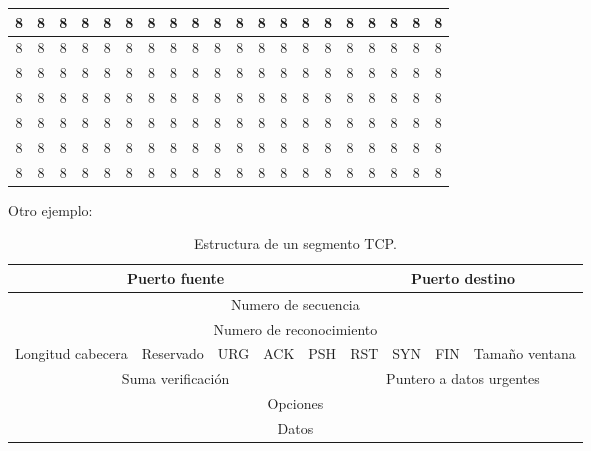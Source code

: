 \documentclass[letterpaper,11pt]{article}
\begin{document}
\begin{landscape}
\begin{center}
\begin{longtable}{|c|c|c|c|c|c|c|c|c|c|c|c|c|c|c|c|c|c|c|c|}
\hline
 8 & 8 & 8 & 8 & 8 & 8 & 8 & 8 & 8 & 8 & 8 & 8 & 8 & 8 & 8 & 8 & 8 & 8 & 8 & 8 \\
\hline
 8 & 8 & 8 & 8 & 8 & 8 & 8 & 8 & 8 & 8 & 8 & 8 & 8 & 8 & 8 & 8 & 8 & 8 & 8 & 8 \\
\hline
 8 & 8 & 8 & 8 & 8 & 8 & 8 & 8 & 8 & 8 & 8 & 8 & 8 & 8 & 8 & 8 & 8 & 8 & 8 & 8 \\
\hline
 8 & 8 & 8 & 8 & 8 & 8 & 8 & 8 & 8 & 8 & 8 & 8 & 8 & 8 & 8 & 8 & 8 & 8 & 8 & 8 \\
\hline
 8 & 8 & 8 & 8 & 8 & 8 & 8 & 8 & 8 & 8 & 8 & 8 & 8 & 8 & 8 & 8 & 8 & 8 & 8 & 8 \\
\hline
 8 & 8 & 8 & 8 & 8 & 8 & 8 & 8 & 8 & 8 & 8 & 8 & 8 & 8 & 8 & 8 & 8 & 8 & 8 & 8 \\
\hline
 8 & 8 & 8 & 8 & 8 & 8 & 8 & 8 & 8 & 8 & 8 & 8 & 8 & 8 & 8 & 8 & 8 & 8 & 8 & 8 \\
\hline
\end{longtable}
\end{center}

\end{landscape}

\newpage

Otro ejemplo:

\begin{table}[h!]
\centering
\resizebox{\textwidth}{!} {
\begin{tabular}{|c|c|c|c|c|c|c|c|c|}
\hline
\multicolumn{5}{|c|}{Puerto fuente} & \multicolumn{4}{|c|}{Puerto destino} \\ \hline
\multicolumn{9}{|c|}{Numero de secuencia} \\ \hline
\multicolumn{9}{|c|}{Numero de reconocimiento} \\ \hline
Longitud cabecera & Reservado & URG & ACK & PSH & RST & SYN & FIN & Tamaño ventana \\ \hline
\multicolumn{5}{|c|}{Suma verificación} & \multicolumn{4}{|c|}{Puntero a datos urgentes} \\ \hline
\multicolumn{9}{|c|}{Opciones} \\ \hline
\multicolumn{9}{|c|}{Datos} \\ \hline
\end{tabular}
}
\caption{Estructura de un segmento TCP.}
\label{tabla:SegmentoTCP}
\end{table}

\newpage
\ClearShipoutPicture 
\end{document}
